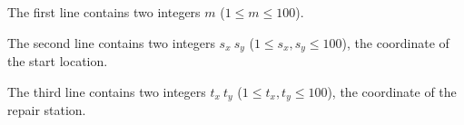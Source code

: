 The first line contains two integers $m$ ($1\le m \le 100$).

The second line contains two integers $s_x\ s_y$ ($1 \le s_x, s_y \le 100$), the coordinate of the start location.

The third line contains two integers $t_x\ t_y$ ($1 \le t_x, t_y \le 100$), the coordinate of the repair station.
